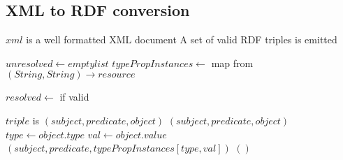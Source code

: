 \documentclass[journal]{IEEEtran}
\begin{document}
\subsection{XML to RDF conversion}
\label{xml-to-rdf-algo}
\begin{algorithmic}
        \Require $xml$ is a well formatted XML document
        \Ensure A set of valid RDF triples is emitted

        \State $unresolved\gets empty list$
        \State $typePropInstances\gets$ map from $(String, String) \rightarrow resource$

            \State {}
        \EndFor

            \State $resolved \gets$ 
            \State {} if valid
        \EndFor
    \EndFunction

        \Require $triple$ is $(subject, predicate, object)$
            \State \Return $(subject, predicate, object)$
            \State $type\gets object.type$
            \State $val\gets object.value$
                \State \Return $(subject, predicate, typePropInstances[type,val])$
            \EndIf
            \State \Return $()$
        \EndIf
    \EndFunction
\end{algorithmic}
\end{document}
